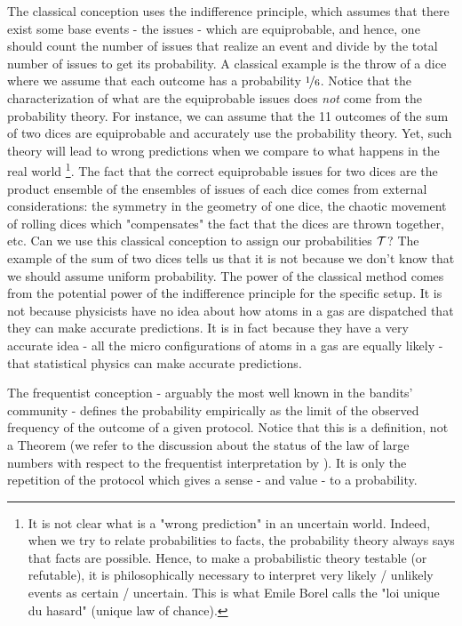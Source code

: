 The classical conception uses the indifference principle, which assumes that there exist some base events - the issues - which are equiprobable, and hence, one should count the number of issues that realize an event and divide by the total number of issues to get its probability. A classical example is the throw of a dice where we assume that each outcome has a probability $\nicefrac{1}{6}$. Notice that the characterization of what are the equiprobable issues does \emph{not} come from the probability theory. For instance, we can assume that the 11 outcomes of the sum of two dices are equiprobable and accurately use the probability theory. Yet, such theory will lead to wrong predictions when we compare to what happens in the real world \footnote{It is not clear what is a "wrong prediction" in an uncertain world. Indeed, when we try to relate probabilities to facts, the probability theory always says that facts are possible. Hence, to make a probabilistic theory testable (or refutable), it is philosophically necessary to interpret very likely / unlikely events as certain / uncertain. This is what Emile Borel calls the "loi unique du hasard" (unique law of chance).}. The fact that the correct equiprobable issues for two dices are the product ensemble of the ensembles of issues of each dice comes from external considerations: the symmetry in the geometry of one dice, the chaotic movement of rolling dices which "compensates" the fact that the dices are thrown together, etc. Can we use this classical conception to assign our probabilities $\mathcal{T}$? The example of the sum of two dices tells us that it is not because we don't know that we should assume uniform probability. The power of the classical method comes from the potential power of the indifference principle for the specific setup. It is not because physicists have no idea about how atoms in a gas are dispatched that they can make accurate predictions. It is in fact because they have a very accurate idea - all the micro configurations of atoms in a gas are equally likely -  that statistical physics can make accurate predictions. 

The frequentist conception - arguably the most well known in the bandits' community - defines the probability empirically as the limit of the observed frequency of the outcome of a given protocol. Notice that this is a definition, not a Theorem (we refer to the discussion about the status of the law of large numbers with respect to the frequentist interpretation by \citet{lavenant2019how}). It is only the repetition of the protocol which gives a sense - and value - to a probability. 

